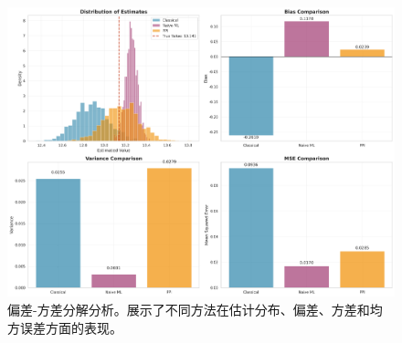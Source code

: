 \documentclass[12pt,a4paper]{article}
\begin{document}
\begin{figure}[H]
    \centering
    \includegraphics[width=1.0\textwidth]{bias_variance_analysis.png}
    \caption{偏差-方差分解分析。展示了不同方法在估计分布、偏差、方差和均方误差方面的表现。}
    \label{fig:bias_variance_analysis}
\end{figure}
\end{document}

